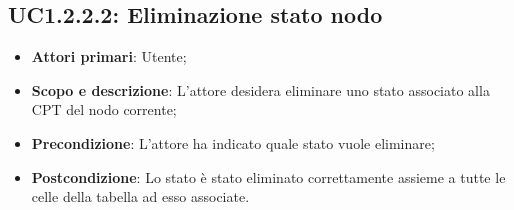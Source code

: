 \subsection{UC1.2.2.2: Eliminazione stato nodo} 
\hypertarget{UC1.2.2.2}{} 
\begin{itemize} 
	\item{\textbf{Attori primari}: Utente;} 
	\item{\textbf{Scopo e descrizione}: L'attore desidera eliminare uno stato associato alla CPT del nodo corrente;} 
	\item{\textbf{Precondizione}: L'attore ha indicato quale stato vuole eliminare;} 
	\item{\textbf{Postcondizione}: Lo stato è stato eliminato correttamente assieme a tutte le celle della tabella ad esso associate.} 
\end{itemize} 
